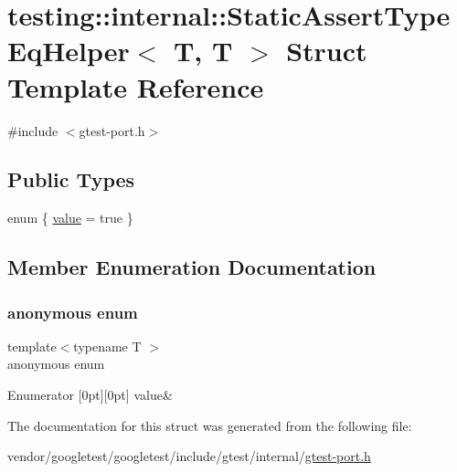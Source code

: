 \hypertarget{structtesting_1_1internal_1_1_static_assert_type_eq_helper_3_01_t_00_01_t_01_4}{}\section{testing\+:\+:internal\+:\+:Static\+Assert\+Type\+Eq\+Helper$<$ T, T $>$ Struct Template Reference}
\label{structtesting_1_1internal_1_1_static_assert_type_eq_helper_3_01_t_00_01_t_01_4}


{\ttfamily \#include $<$gtest-\/port.\+h$>$}

\subsection*{Public Types}
\begin{DoxyCompactItemize}
\item 
enum \{ \hyperlink{structtesting_1_1internal_1_1_static_assert_type_eq_helper_3_01_t_00_01_t_01_4_acdb69a9c4164628ea6a80bd6442058c6a63c475f543e4e977d43c5093dd2b7f3f}{value} = true
 \}
\end{DoxyCompactItemize}


\subsection{Member Enumeration Documentation}
\mbox{\label{structtesting_1_1internal_1_1_static_assert_type_eq_helper_3_01_t_00_01_t_01_4_acdb69a9c4164628ea6a80bd6442058c6}} 
\subsubsection{\texorpdfstring{anonymous enum}{anonymous enum}}
{\footnotesize\ttfamily template$<$typename T $>$ \\
anonymous enum}

\begin{DoxyEnumFields}{Enumerator}
[0pt][0pt]{}\mbox{\label{structtesting_1_1internal_1_1_static_assert_type_eq_helper_3_01_t_00_01_t_01_4_acdb69a9c4164628ea6a80bd6442058c6a63c475f543e4e977d43c5093dd2b7f3f}} 
value&\\
\hline

\end{DoxyEnumFields}


The documentation for this struct was generated from the following file\+:\begin{DoxyCompactItemize}
\item 
vendor/googletest/googletest/include/gtest/internal/\hyperlink{gtest-port_8h}{gtest-\/port.\+h}\end{DoxyCompactItemize}
